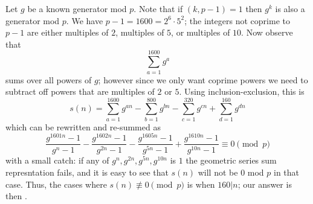 \begin{solution}\hfil\medskip
	
	Let $g$ be a known generator mod $p$. Note that if $(k, p - 1) = 1$ then $g^k$ is also a generator mod $p$. We have $p - 1 = 1600 = 2^6 \cdot 5^2$; 
	the integers not coprime to $p - 1$ are either multiples of $2$, multiples of $5$, or multiples of $10$. Now observe that $$\sum_{a = 1}^{1600} g^a$$
	sums over all powers of $g$; however since we only want coprime powers we need to subtract off powers that are multiples of $2$ or $5$. Using inclusion-exclusion, 
	this is $$s(n) = \sum_{a = 1}^{1600} g^{an} - \sum_{b = 1}^{800} g^{bn} - \sum_{c = 1}^{320} g^{cn} + \sum_{d = 1}^{160} g^{dn}$$
	which can be rewritten and re-summed as $$\dfrac{g^{1601n} - 1}{g^n - 1} - \dfrac{g^{1602n} - 1}{g^{2n} - 1} - \dfrac{g^{1605n} - 1}{g^{5n} - 1} + \dfrac{g^{1610n} - 1}{g^{10n} - 1} \equiv 0 \pmod{p}$$
	with a small catch: if any of $g^n, g^{2n}, g^{5n}, g^{10n}$ is $1$ the geometric series sum represntation fails, and it is easy to see that $s(n)$ will not be $0$ mod $p$ 
	in that case. Thus, the cases where $s(n) \not\equiv 0 \pmod{p}$ is when $160|n$; our answer is then .
\end{solution}\bigskip